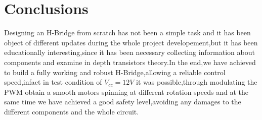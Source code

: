 \section{Conclusions}

Designing an H-Bridge from scratch has not been a simple task and it has been object of different updates during the whole project developement,but it has been educationally interesting,since it has been necessary collecting information about components and examine in depth transistors theory.In the end,we have achieved to build a fully working and robust H-Bridge,allowing a reliable control speed,infact in test condition of $V_{cc}=12 V$ it was possible,through modulating the PWM obtain a smooth motors spinning at different rotation speeds and at the same time we have achieved a good safety level,avoiding any damages to the different components and the whole circuit.